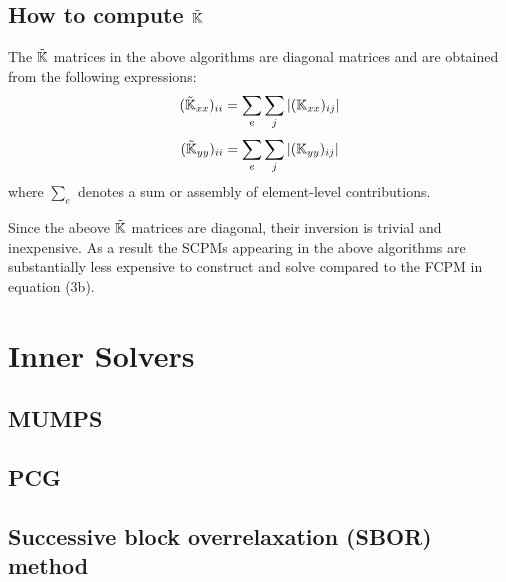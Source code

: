 \documentclass[a4paper,12pt]{article}
\begin{document}
\subsection{How to compute $\tilde{{\mathbb{K}}}$}

The $\tilde{{\mathbb{K}}}$ matrices in the above algorithms are diagonal 
matrices and are obtained from the
following expressions:
\[
(\tilde{{\mathbb{K}}}_{xx})_{ii} = \sum_e \sum_j | ({\mathbb{K}}_{xx})_{ij} |
\]
\[
(\tilde{{\mathbb{K}}}_{yy})_{ii} = \sum_e \sum_j | ({\mathbb{K}}_{yy})_{ij} |
\]
where $\sum_e$ denotes a sum or assembly of element-level contributions.

Since the abeove $\tilde{{\mathbb{K}}}$ matrices are diagonal, their inversion 
is trivial and inexpensive. As
a result the SCPMs appearing in the above algorithms are 
substantially less expensive to
construct and solve compared to the FCPM in equation (3b).



\newpage
\section{Inner Solvers}

\subsection{MUMPS}


\subsection{PCG}


\subsection{Successive block overrelaxation (SBOR) method}
\end{document}
